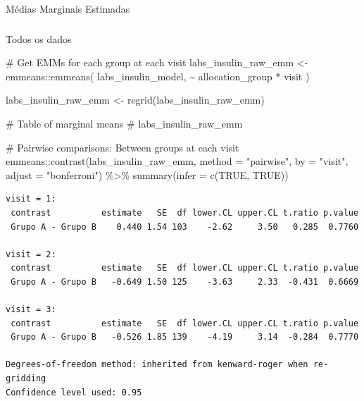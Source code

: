 \documentclass[
  12pt,
]{article}
\makeatletter
\let\oldparagraph\paragraph
\renewcommand{\paragraph}{
    \@ifstar
      \xxxParagraphStar
      \xxxParagraphNoStar
  }
\newcommand{\xxxParagraphStar}[1]{\oldparagraph*{#1}\mbox{}}
\newcommand{\xxxParagraphNoStar}[1]{\oldparagraph{#1}\mbox{}}
\let\oldsubparagraph\subparagraph
\renewcommand{\subparagraph}{
    \@ifstar
      \xxxSubParagraphStar
      \xxxSubParagraphNoStar
  }
\newcommand{\xxxSubParagraphStar}[1]{\oldsubparagraph*{#1}\mbox{}}
\newcommand{\xxxSubParagraphNoStar}[1]{\oldsubparagraph{#1}\mbox{}}
\newenvironment{Shaded}{\begin{snugshade}}{\end{snugshade}}
\newcommand{\AttributeTok}[1]{\textcolor[rgb]{0.40,0.45,0.13}{#1}}
\newcommand{\CommentTok}[1]{\textcolor[rgb]{0.37,0.37,0.37}{#1}}
\newcommand{\ConstantTok}[1]{\textcolor[rgb]{0.56,0.35,0.01}{#1}}
\newcommand{\FunctionTok}[1]{\textcolor[rgb]{0.28,0.35,0.67}{#1}}
\newcommand{\NormalTok}[1]{\textcolor[rgb]{0.00,0.23,0.31}{#1}}
\newcommand{\OtherTok}[1]{\textcolor[rgb]{0.00,0.23,0.31}{#1}}
\newcommand{\SpecialCharTok}[1]{\textcolor[rgb]{0.37,0.37,0.37}{#1}}
\newcommand{\StringTok}[1]{\textcolor[rgb]{0.13,0.47,0.30}{#1}}
\makeatother
\begin{document}
\paragraph{Médias Marginais
Estimadas}\label{muxe9dias-marginais-estimadas-10}

\subparagraph{Todos os dados}\label{todos-os-dados-10}

\begin{Shaded}
\begin{Highlighting}[]
\CommentTok{\# Get EMMs for each group at each visit}
\NormalTok{labs\_insulin\_raw\_emm }\OtherTok{\textless{}{-}}\NormalTok{ emmeans}\SpecialCharTok{::}\FunctionTok{emmeans}\NormalTok{(}
\NormalTok{    labs\_insulin\_model, }
    \SpecialCharTok{\textasciitilde{}}\NormalTok{ allocation\_group }\SpecialCharTok{*}\NormalTok{ visit}
\NormalTok{)}

\NormalTok{labs\_insulin\_raw\_emm }\OtherTok{\textless{}{-}} \FunctionTok{regrid}\NormalTok{(labs\_insulin\_raw\_emm)}

\CommentTok{\# Table of marginal means}
\CommentTok{\# labs\_insulin\_raw\_emm}

\CommentTok{\# Pairwise comparisons: Between groups at each visit}
\NormalTok{emmeans}\SpecialCharTok{::}\FunctionTok{contrast}\NormalTok{(labs\_insulin\_raw\_emm,}
\AttributeTok{method =} \StringTok{"pairwise"}\NormalTok{, }\AttributeTok{by =} \StringTok{"visit"}\NormalTok{,}
\AttributeTok{adjust =} \StringTok{"bonferroni"}\NormalTok{) }\SpecialCharTok{\%\textgreater{}\%} \FunctionTok{summary}\NormalTok{(}\AttributeTok{infer =} \FunctionTok{c}\NormalTok{(}\ConstantTok{TRUE}\NormalTok{, }\ConstantTok{TRUE}\NormalTok{))}
\end{Highlighting}
\end{Shaded}

\begin{verbatim}
visit = 1:
 contrast          estimate   SE  df lower.CL upper.CL t.ratio p.value
 Grupo A - Grupo B    0.440 1.54 103    -2.62     3.50   0.285  0.7760

visit = 2:
 contrast          estimate   SE  df lower.CL upper.CL t.ratio p.value
 Grupo A - Grupo B   -0.649 1.50 125    -3.63     2.33  -0.431  0.6669

visit = 3:
 contrast          estimate   SE  df lower.CL upper.CL t.ratio p.value
 Grupo A - Grupo B   -0.526 1.85 139    -4.19     3.14  -0.284  0.7770

Degrees-of-freedom method: inherited from kenward-roger when re-gridding 
Confidence level used: 0.95 
\end{verbatim}
\end{document}

